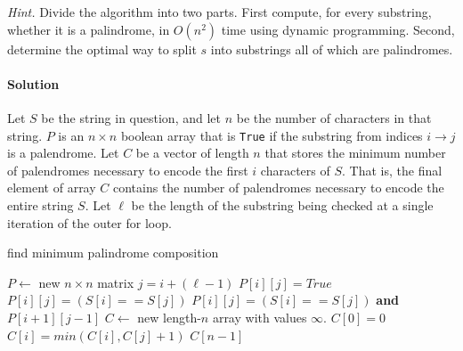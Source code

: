 \documentclass[11pt]{article}
\begin{document}
\textit{Hint.} Divide the algorithm into two parts. First compute, for every substring, whether it is a palindrome, in $O(n^2)$ time using dynamic programming. Second, determine the optimal way to split $s$ into substrings all of which are palindromes.

\paragraph{Solution}
Let $S$ be the string in question, and let $n$ be the number of characters in
that string. $P$ is an $n\times n$ boolean array that is \texttt{True} if the
substring from indices $i \rightarrow j$ is a palendrome. Let $C$ be a vector of 
length $n$ that stores the minimum number of palendromes necessary to encode the
first $i$ characters of $S$. That is, the final element of array $C$ contains
the number of palendromes necessary to encode the entire string $S$. Let
$\ell$ be the length of the substring being checked at a single iteration of
the outer for loop.

\begin{algorithm}
\caption{find minimum palindrome composition}
\begin{algorithmic}[1]
    \State $P \leftarrow$ new $n \times n$ matrix
            \State $j = i + (\ell - 1)$        
                \State $P[i][j] = True$
                \State $P[i][j] = (S[i] == S[j])$
                \Else
                \State $P[i][j] = (S[i] == S[j])$ \textbf{and} $P[i+1][j-1]$
                \EndIf
            \EndIf
        \EndFor
    \EndFor
    \State 
    \State $C \leftarrow$ new length-$n$ array with values $\infty$.
    \State $C[0] = 0$
                \State $C[i] = min(C[i], C[j]+1)$
            \EndIf
        \EndFor
    \EndFor
    \State \Return $C[n-1]$
\EndProcedure 
\end{algorithmic}
\end{algorithm}

\pagebreak
\end{document}
